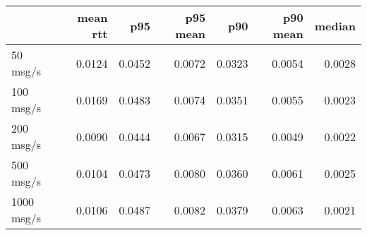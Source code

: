 \begin{tabular}{l|rrrrrr}
\rowcolor{gray!50}
 & mean rtt & p95 & p95 mean & p90 & p90 mean & median\\\hline
50 msg/s & 0.0124 & 0.0452 & 0.0072 & 0.0323 & 0.0054 & 0.0028 \\
100 msg/s & 0.0169 & 0.0483 & 0.0074 & 0.0351 & 0.0055 & 0.0023 \\
200 msg/s & 0.0090 & 0.0444 & 0.0067 & 0.0315 & 0.0049 & 0.0022 \\
500 msg/s & 0.0104 & 0.0473 & 0.0080 & 0.0360 & 0.0061 & 0.0025 \\
1000 msg/s & 0.0106 & 0.0487 & 0.0082 & 0.0379 & 0.0063 & 0.0021 \\
\end{tabular}
